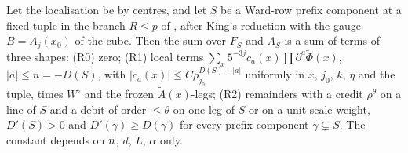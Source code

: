 \begin{theorem}\label{thm:a02:WR}
Let the localisation be by centres, and let $S$ be a Ward-row prefix component at a fixed tuple in the branch $R\le p$ of \cite[(3.39)]{K1}, after King's reduction \cite[(3.43)--(3.55)]{K1} with the gauge $B=A_j(x_0)$ of the cube. Then the sum over $F_S$ and $A_S$ is a sum of terms of three shapes: \textup{(R0)} zero; \textup{(R1)} local terms $\sum_x5^{-3j}c_a(x)\prod\partial^a\tilde\Phi(x)$, $|a|\le n=-D(S)$, with $|c_a(x)|\le C\rho_{j_0}^{D(S)+|a|}$ uniformly in $x$, $j_0$, $k$, $\eta$ and the tuple, times $W^\circ$ and the frozen $\tilde A(x)$-legs; \textup{(R2)} remainders with a credit $\rho^\theta$ on a line of $S$ and a debit of order $\le\theta$ on one leg of $S$ or on a unit-scale weight, $D'(S)>0$ and $D'(\gamma)\ge D(\gamma)$ for every prefix component $\gamma\subsetneq S$. The constant depends on $\bar n$, $d$, $L$, $\alpha$ only.
\end{theorem}

